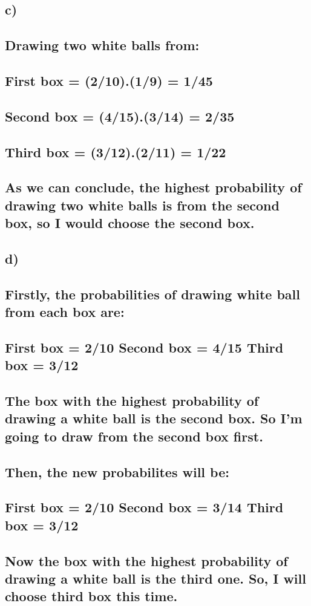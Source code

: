 \documentclass[15pt]{article}
\begin{document}
\subsection*{c)
\\\\ Drawing two white balls from:
\\\\ First box = (2/10).(1/9) = 1/45
\\\\ Second box = (4/15).(3/14) = 2/35
\\\\ Third box = (3/12).(2/11) = 1/22
\\\\ As we can conclude, the highest probability of drawing two white balls is from the second box, so I would choose the second box.
\\
}
\subsection*{d) 
\\\\Firstly, the probabilities of drawing white ball from each box are:
\\\\First box = 2/10 \hspace*{30} Second box = 4/15 \hspace*{30} Third box = 3/12
\\\\The box with the highest probability of drawing a white ball is the second box. So I'm going to draw from the second box first. 
\\\\Then, the new probabilites will be:
\\\\First box = 2/10 \hspace*{30} Second box = 3/14 \hspace*{30} Third box = 3/12
\\\\Now the box with the highest probability of drawing a white ball is the third one. So, I will choose third box this time.
\\
}
\end{document}
